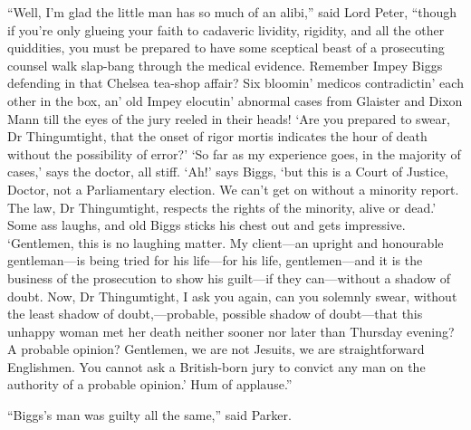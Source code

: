 \enquote{Well, I’m glad the little man has so much of an alibi,} said Lord Peter, \enquote{though if you’re only glueing your faith to cadaveric lividity, rigidity, and all the other quiddities, you must be prepared to have some sceptical beast of a prosecuting counsel walk slap-bang through the medical evidence. Remember Impey Biggs defending in that Chelsea tea-shop affair? Six bloomin’ medicos contradictin’ each other in the box, an’ old Impey elocutin’ abnormal cases from Glaister and Dixon Mann till the eyes of the jury reeled in their heads! \enquote{Are you prepared to swear, Dr Thingumtight, that the onset of rigor mortis indicates the hour of death without the possibility of error?} \enquote{So far as my experience goes, in the majority of cases,} says the doctor, all stiff. \enquote{Ah!} says Biggs, \enquote{but this is a Court of Justice, Doctor, not a Parliamentary election. We can’t get on without a minority report. The law, Dr Thingumtight, respects the rights of the minority, alive or dead.} Some ass laughs, and old Biggs sticks his chest out and gets impressive. \enquote{Gentlemen, this is no laughing matter. My client\allowbreak---\allowbreak an upright and honourable gentleman\allowbreak---\allowbreak is being tried for his life\allowbreak---\allowbreak for his life, gentlemen\allowbreak---\allowbreak and it is the business of the prosecution to show his guilt\allowbreak---\allowbreak if they can\allowbreak---\allowbreak without a shadow of doubt. Now, Dr Thingumtight, I ask you again, can you solemnly swear, without the least shadow of doubt,---probable, possible shadow of doubt\allowbreak---\allowbreak that this unhappy woman met her death neither sooner nor later than Thursday evening? A probable opinion? Gentlemen, we are not Jesuits, we are straightforward Englishmen. You cannot ask a British-born jury to convict any man on the authority of a probable opinion.} Hum of applause.}

\enquote{Biggs’s man was guilty all the same,} said Parker.

